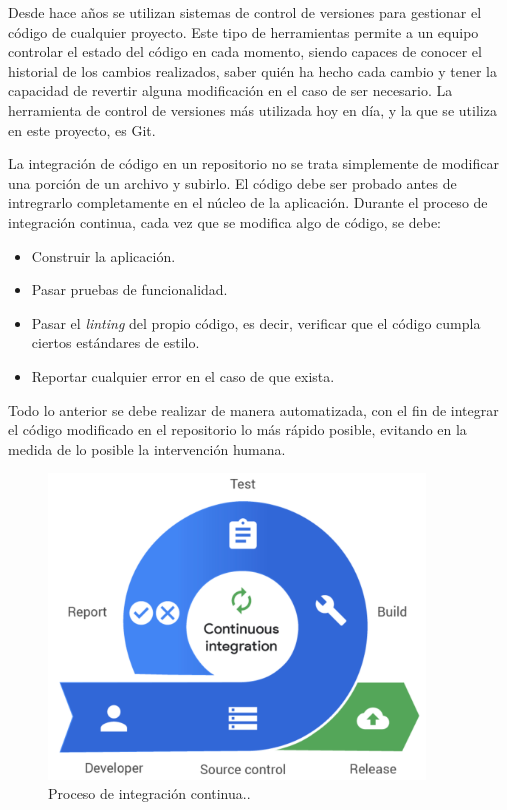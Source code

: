 Desde hace años se utilizan sistemas de control de versiones para gestionar el código de cualquier proyecto. Este tipo de herramientas permite a un equipo controlar el estado del código en cada momento, siendo capaces de conocer el historial de los cambios realizados, saber quién ha hecho cada cambio y tener la capacidad de revertir alguna modificación en el caso de ser necesario. La herramienta de control de versiones más utilizada hoy en día, y la que se utiliza en este proyecto, es Git\cite{git}.

La integración de código en un repositorio no se trata simplemente de modificar una porción de un archivo y subirlo. El código debe ser probado antes de intregrarlo completamente en el núcleo de la aplicación. Durante el proceso de integración continua, cada vez que se modifica algo de código, se debe:

\begin{itemize}
  \item Construir la aplicación.
  \item Pasar pruebas de funcionalidad.
  \item Pasar el \textit{linting} del propio código, es decir, verificar que el código cumpla ciertos estándares de estilo.
  \item Reportar cualquier error en el caso de que exista.
\end{itemize}

Todo lo anterior se debe realizar de manera automatizada, con el fin de integrar el código modificado en el repositorio lo más rápido posible, evitando en la medida de lo posible la intervención humana.

\begin{figure}
  \centerline{\includegraphics[width=10cm]{figuras/ci}}
  \caption{Proceso de integración continua.\cite{img:ci}.}
  \label{fig:ci}
\end{figure}

